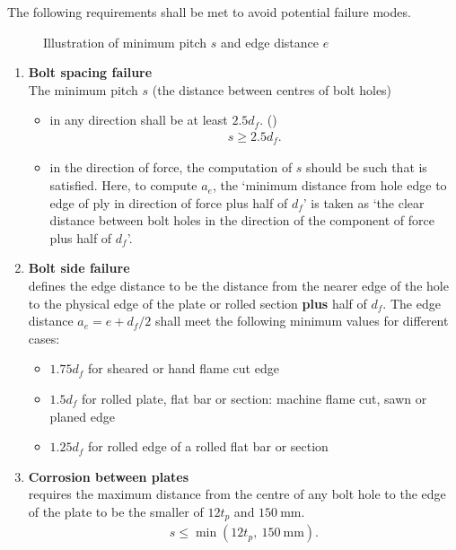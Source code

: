 The following requirements shall be met to avoid potential failure modes.
\begin{figure}[H]
\centering\caption{Illustration of minimum pitch $s$ and edge distance $e$}
\end{figure}
\begin{enumerate}
\item \textbf{Bolt spacing failure}\\
The minimum pitch $s$ (the distance between centres of bolt holes)
\begin{itemize}
\item in any direction shall be at least $2.5d_f$. ()
\begin{gather}
s\geqslant2.5d_f.
\end{gather}
\item in the direction of force, the computation of $s$ should be such that  is satisfied. Here, to compute $a_e$, the `minimum distance from hole edge to edge of ply in direction of force plus half of $d_f$' is taken as `the clear distance between bolt holes in the direction of the component of force plus half of $d_f$'.
\end{itemize}
\item \textbf{Bolt side failure}\\
 defines the edge distance to be the distance from the nearer edge of the hole to the physical edge of the plate or rolled section \textbf{plus} half of $d_f$. The edge distance $a_e=e+d_f/2$ shall meet the following minimum values for different cases:
\begin{itemize}
\item $1.75d_f$ for sheared or hand flame cut edge
\item $1.5d_f$ for rolled plate, flat bar or section: machine flame cut, sawn or planed edge
\item $1.25d_f$ for rolled edge of a rolled flat bar or section
\end{itemize}
\item \textbf{Corrosion between plates}\\
 requires the maximum distance from the centre of any bolt hole to the edge of the plate to be the smaller of $12t_p$ and $\SI{150}{\mm}$.
\begin{gather}
s\leqslant\min\left(12t_p,~\SI{150}{\mm}\right).
\end{gather}
\end{enumerate}
